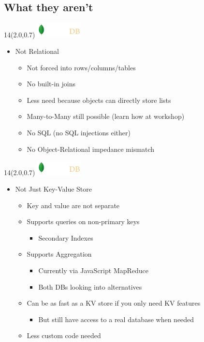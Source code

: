 \documentclass{beamer}
\newcommand{\MongoLogo}{
\begin{textblock}{14}(2.0,0.7)
  \includegraphics[height=0.8cm]{logo-mongodb-ondark.png}
\end{textblock}
}
\begin{document}
\subsection{What they aren't}
\begin{frame}
  \MongoLogo

  \begin{itemize}
    \item Not Relational
    \begin{itemize}
      \item Not forced into rows/columns/tables
      \item No built-in joins
      \item Less need because objects can directly store lists
      \item Many-to-Many still possible (learn how at workshop)
      \item No SQL (no SQL injections either)
      \item No Object-Relational impedance mismatch
    \end{itemize}
  \end{itemize}
\end{frame}

\begin{frame}
  \MongoLogo

  \begin{itemize}
    \item Not Just Key-Value Store
    \begin{itemize}
      \item Key and value are not separate
      \item Supports queries on non-primary keys
        \begin{itemize}
          \item Secondary Indexes
        \end{itemize}

      \item Supports Aggregation
        \begin{itemize}
          \item Currently via JavaScript MapReduce
          \item Both DBs looking into alternatives
        \end{itemize}
        
      \item Can be as fast as a KV store if you only need KV features
        \begin{itemize}
          \item But still have access to a real database when needed
        \end{itemize}

      \item Less custom code needed
    \end{itemize}
  \end{itemize}
\end{frame}
\end{document}

